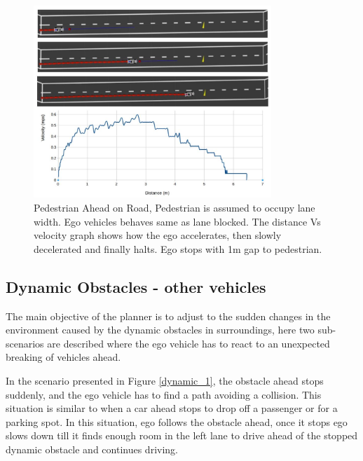 \begin{figure}
    \centering
    \includegraphics[width=0.8\textwidth]{Images/evaluation/stopping_pedestrian.jpg}
    \caption{Pedestrian Ahead on Road, Pedestrian is assumed to occupy lane width. Ego vehicles behaves same as lane blocked. The distance Vs velocity graph shows how the ego accelerates, then slowly decelerated and finally halts. Ego stops with 1m gap to pedestrian.}
    \label{pedestrian_ahead}
\end{figure}

\subsection{Dynamic Obstacles - other vehicles}
The main objective of the planner is to adjust to the sudden changes in the environment caused by the dynamic obstacles in surroundings, here two sub-scenarios are described where the ego vehicle has to react to an unexpected breaking of vehicles ahead. 

In the scenario presented in Figure \ref{dynamic_1}, the obstacle ahead stops suddenly, and the ego vehicle has to find a path avoiding a collision. This situation is similar to when a car ahead stops to drop off a passenger or for a parking spot. In this situation, ego follows the obstacle ahead, once it stops ego slows down till it finds enough room in the left lane to drive ahead of the stopped dynamic obstacle and continues driving. 

\iffalse 

